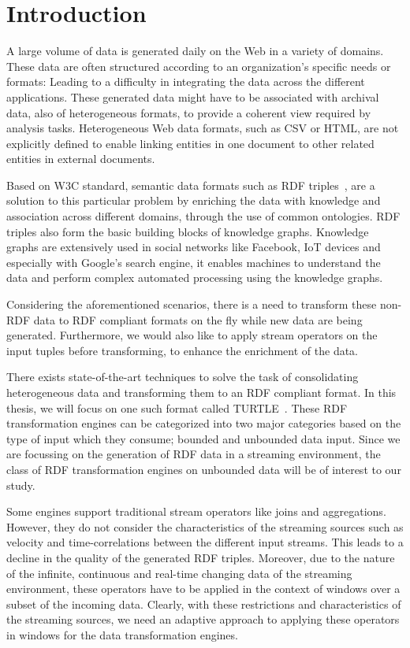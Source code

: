 \chapter{Introduction}
\label{chap:intro}

A large volume of data is generated daily on the Web in a variety of domains. These
data are often structured according to an organization's specific needs or formats: Leading to
a difficulty in integrating the data across the different applications.
These generated data might have to be associated with archival data, also of heterogeneous formats,
to provide a coherent view required by analysis tasks. Heterogeneous Web data formats, such as CSV or HTML, are not explicitly
defined to enable linking entities in one document to other related entities in external documents.

Based on W3C standard, semantic data formats such as RDF triples~\cite{intro_rdf}, are a solution to
this particular problem by enriching the data with knowledge and association across
different domains, through the use of common ontologies. RDF triples also form the basic building blocks of knowledge graphs.
Knowledge graphs are extensively used in social networks like Facebook\cite{facebook_linked_data}, IoT devices\cite{graph_of_things} and especially with Google's search
engine\cite{google_kg}, it enables machines to understand the data and perform complex automated processing
using the knowledge graphs. 

Considering the aforementioned scenarios, there is a need to transform these non-RDF data to RDF compliant formats on the fly while
new data are being generated. Furthermore, we would also like to apply stream operators on the input tuples
before transforming, to enhance the enrichment of the data.

There exists state-of-the-art techniques to solve the task of consolidating heterogeneous data
and transforming them to an RDF compliant format. In this thesis, we will focus on one such format called TURTLE~\cite{turtle_syntax}.
These RDF transformation engines can be categorized into two major categories based on the type of input
which they consume; bounded and unbounded data input. Since we are focussing on the generation of RDF data
in a streaming environment, the class of RDF transformation engines on unbounded data will be of interest to our study.

Some engines support traditional stream operators like joins and aggregations. However, they do not consider
the characteristics of the streaming sources such as velocity and time-correlations between the different
input streams. This leads to a decline in the quality of the generated RDF triples. Moreover,
due to the nature of the infinite, continuous and real-time changing data of the streaming environment,
these operators have to be applied in the context of windows over a subset of the incoming data.
Clearly, with these restrictions and characteristics of the streaming sources, we need an adaptive approach
to applying these operators in windows for the data transformation engines.
